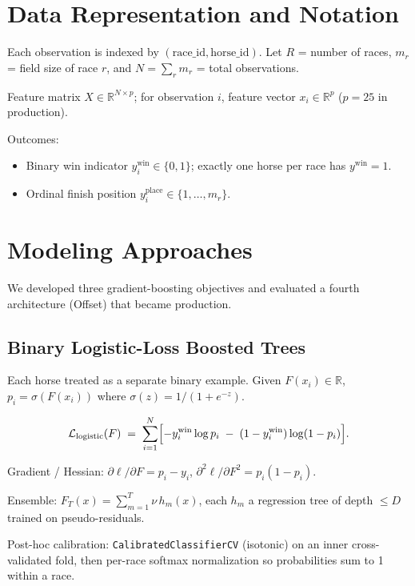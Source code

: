 \documentclass[11pt]{article}
\begin{document}
\section{Data Representation and Notation}

Each observation is indexed by $(\text{race\_id}, \text{horse\_id})$. Let
$R$ = number of races, $m_r$ = field size of race $r$, and
$N = \sum_r m_r$ = total observations.

Feature matrix $X \in \mathbb{R}^{N\times p}$; for observation $i$,
feature vector $x_i \in \mathbb{R}^p$ ($p = 25$ in production).

Outcomes:
\begin{itemize}\item Binary win indicator $y_i^{\text{win}} \in \{0,1\}$; exactly one horse per
      race has $y^{\text{win}}=1$.
\item Ordinal finish position $y_i^{\text{place}} \in \{1,\dots,m_r\}$.
\end{itemize}

\section{Modeling Approaches}

We developed three gradient-boosting objectives and evaluated a fourth
architecture (Offset) that became production.

\subsection{Binary Logistic-Loss Boosted Trees}

Each horse treated as a separate binary example. Given $F(x_i) \in \mathbb{R}$,
$p_i = \sigma(F(x_i))$ where $\sigma(z) = 1/(1+e^{-z})$.

\[
\mathcal{L}_{\text{logistic}}(F) \;=\; \sum_{i=1}^{N}
  \Bigl[-y_i^{\text{win}}\log p_i \;-\; (1-y_i^{\text{win}})\log(1-p_i)\Bigr].
\]

Gradient / Hessian: $\partial\ell/\partial F = p_i - y_i$,
$\partial^2\ell/\partial F^2 = p_i(1-p_i)$.

Ensemble: $F_T(x) = \sum_{m=1}^{T} \nu\, h_m(x)$,
each $h_m$ a regression tree of depth $\leq D$ trained on pseudo-residuals.

Post-hoc calibration: \texttt{CalibratedClassifierCV} (isotonic) on an
inner cross-validated fold, then per-race softmax normalization so
probabilities sum to 1 within a race.
\end{document}
